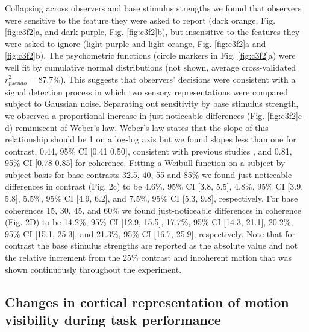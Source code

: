 Collapsing across observers and base stimulus strengths we found that observers were sensitive to the feature they were asked to report (dark orange, Fig. \ref{fig:c3f2}a, and dark purple, Fig. \ref{fig:c3f2}b), but insensitive to the features they were asked to ignore (light purple and light orange, Fig. \ref{fig:c3f2}a and \ref{fig:c3f2}b). The psychometric functions (circle markers in Fig. \ref{fig:c3f2}a) were well fit by cumulative normal distributions (not shown, average cross-validated $r_{pseudo}^2=87.7$\%). This suggests that observers’ decisions were consistent with a signal detection process in which two sensory representations were compared subject to Gaussian noise. Separating out sensitivity by base stimulus strength, we observed a proportional increase in just-noticeable differences (Fig. \ref{fig:c3f2}c-d) reminiscent of Weber's law. Weber’s law states that the slope of this relationship should be 1 on a log-log axis but we found slopes less than one for contrast, 0.44, 95\% CI [0.41 0.50], consistent with previous studies \citep{Gorea2001-yt,Pestilli2011-gi}, and 0.81, 95\% CI [0.78 0.85] for coherence. Fitting a Weibull function on a subject-by-subject basis for base contrasts 32.5, 40, 55 and 85\% we found just-noticeable differences in contrast (Fig. 2c) to be 4.6\%, 95\% CI [3.8, 5.5], 4.8\%, 95\% CI [3.9, 5.8], 5.5\%, 95\% CI [4.9, 6.2], and 7.5\%, 95\% CI [5.3, 9.8], respectively. For base coherences 15, 30, 45, and 60\% we found just-noticeable differences in coherence (Fig. 2D) to be 14.2\%, 95\% CI [12.9, 15.5], 17.7\%, 95\% CI [14.3, 21.1], 20.2\%, 95\% CI [15.1, 25.3], and 21.3\%, 95\% CI [16.7, 25.9], respectively. Note that for contrast the base stimulus strengths are reported as the absolute value and not the relative increment from the 25\% contrast and incoherent motion that was shown continuously throughout the experiment.

\subsection{Changes in cortical representation of motion visibility during task performance}

